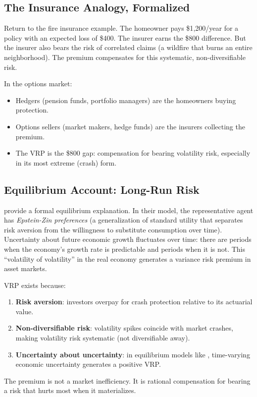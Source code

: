 \subsection{The Insurance Analogy, Formalized}

Return to the fire insurance example.
The homeowner pays \$1{,}200/year for a policy with an expected loss of \$400.
The insurer earns the \$800 difference.
But the insurer also bears the risk of correlated claims (a wildfire that burns an entire neighborhood).
The premium compensates for this systematic, non-diversifiable risk.

In the options market:
\begin{itemize}[nosep]
  \item Hedgers (pension funds, portfolio managers) are the homeowners buying protection.
  \item Options sellers (market makers, hedge funds) are the insurers collecting the premium.
  \item The VRP is the \$800 gap: compensation for bearing volatility risk, especially in its most extreme (crash) form.
\end{itemize}

\subsection{Equilibrium Account: Long-Run Risk}

\citet{DrechslerYaron2011} provide a formal equilibrium explanation.
In their model, the representative agent has \emph{Epstein-Zin preferences} (a generalization of standard utility that separates risk aversion from the willingness to substitute consumption over time).
Uncertainty about future economic growth fluctuates over time: there are periods when the economy's growth rate is predictable and periods when it is not.
This ``volatility of volatility'' in the real economy generates a variance risk premium in asset markets.

\begin{keyidea}
VRP exists because:
\begin{enumerate}[nosep]
  \item \textbf{Risk aversion}: investors overpay for crash protection relative to its actuarial value.
  \item \textbf{Non-diversifiable risk}: volatility spikes coincide with market crashes, making volatility risk systematic (not diversifiable away).
  \item \textbf{Uncertainty about uncertainty}: in equilibrium models like \citet{DrechslerYaron2011}, time-varying economic uncertainty generates a positive VRP.
\end{enumerate}
The premium is not a market inefficiency. It is rational compensation for bearing a risk that hurts most when it materializes.
\end{keyidea}


